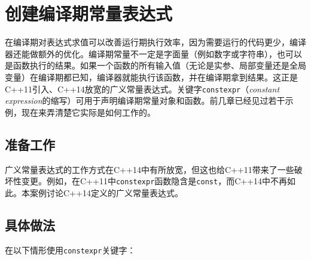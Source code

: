 
\section{创建编译期常量表达式}



在编译期对表达式求值可以改善运行期执行效率，因为需要运行的代码更少，编译器还能做额外的优化。编译期常量不一定是字面量（例如数字或字符串），也可以是函数执行的结果。如果一个函数的所有输入值（无论是实参、局部变量还是全局变量）在编译期都已知，编译器就能执行该函数，并在编译期拿到结果。这正是C++11引入、C++14放宽的广义常量表达式。关键字\texttt{constexpr}（\textit{constant expression}的缩写）可用于声明编译期常量对象和函数。前几章已经见过若干示例，现在来弄清楚它实际是如何工作的。



\subsection{准备工作}



广义常量表达式的工作方式在C++14中有所放宽，但这也给C++11带来了一些破坏性变更。例如，在C++11中\texttt{constexpr}函数隐含是\texttt{const}，而C++14中不再如此。本案例讨论C++14定义的广义常量表达式。



\subsection{具体做法}



在以下情形使用\texttt{constexpr}关键字：



